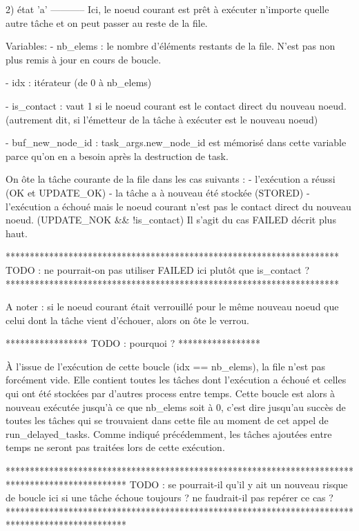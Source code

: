 2) état 'a'
-----------
Ici, le noeud courant est prêt à exécuter n'importe quelle autre tâche et on peut passer au reste de
la file.

Variables:
    - nb_elems   :      le nombre d'éléments restants de la file.
                        N'est pas non plus remis à jour en cours de boucle.

    - idx        :      itérateur (de 0 à nb_elems)

    - is_contact :      vaut 1 si le noeud courant est le contact direct du nouveau noeud.
                        (autrement dit, si l'émetteur de la tâche à exécuter est le nouveau noeud)

    - buf_new_node_id : task_args.new_node_id est mémorisé dans cette variable parce qu'on en a besoin
                        après la destruction de task.

    On ôte la tâche courante de la file dans les cas suivants :
        - l'exécution a réussi (OK et UPDATE_OK)
        - la tâche a à nouveau été stockée (STORED)
        - l'exécution a échoué mais le noeud courant n'est pas le contact direct du nouveau noeud.
          (UPDATE_NOK && !is_contact)
          Il s'agit du cas FAILED décrit plus haut.

*********************************************************************
TODO : ne pourrait-on pas utiliser FAILED ici plutôt que is_contact ?
*********************************************************************

A noter : si le noeud courant était verrouillé pour le même nouveau noeud que
celui dont la tâche vient d'échouer, alors on ôte le verrou.

*****************
TODO : pourquoi ?
*****************

À l'issue de l'exécution de cette boucle (idx == nb_elems), la file n'est pas forcément vide. Elle
contient toutes les tâches dont l'exécution a échoué et celles qui ont été stockées par d'autres
process entre temps. Cette boucle est alors à nouveau exécutée jusqu'à ce que nb_elems soit à 0,
c'est dire jusqu'au succès de toutes les tâches qui se trouvaient dans cette file au moment de
cet appel de run_delayed_tasks. Comme indiqué précédemment, les tâches ajoutées entre temps ne
seront pas traitées lors de cette exécution.

*************************************************************************************************
TODO : se pourrait-il qu'il y ait un nouveau risque de boucle ici si une tâche échoue toujours ?
       ne faudrait-il pas repérer ce cas ?
*************************************************************************************************


